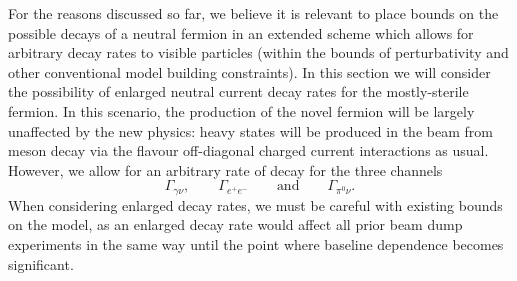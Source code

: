 \documentclass[11pt, a4paper]{article}
\begin{document}
For the reasons discussed so far, we believe it is relevant to place bounds on
the possible decays of a neutral fermion in an extended scheme which allows for
arbitrary decay rates to visible particles (within the bounds of perturbativity
and other conventional model building constraints).
%
In this section we will consider the possibility of enlarged neutral current
decay rates for the mostly-sterile fermion. In this scenario, the production of
the novel fermion will be largely unaffected by the new physics: heavy states
will be produced in the beam from meson decay via the flavour off-diagonal
charged current interactions as usual. However, we allow for an arbitrary rate
of decay for the three channels
%
\[  \Gamma_{\gamma\nu},\qquad \Gamma_{e^+e^-}\qquad \text{and} \qquad
\Gamma_{\pi^0\nu}. \]
%
 When considering enlarged decay rates, we must be careful with existing bounds
on the model, as an enlarged decay rate would affect all prior beam dump
experiments in the same way until the point where baseline dependence becomes
significant. 



\end{document}
